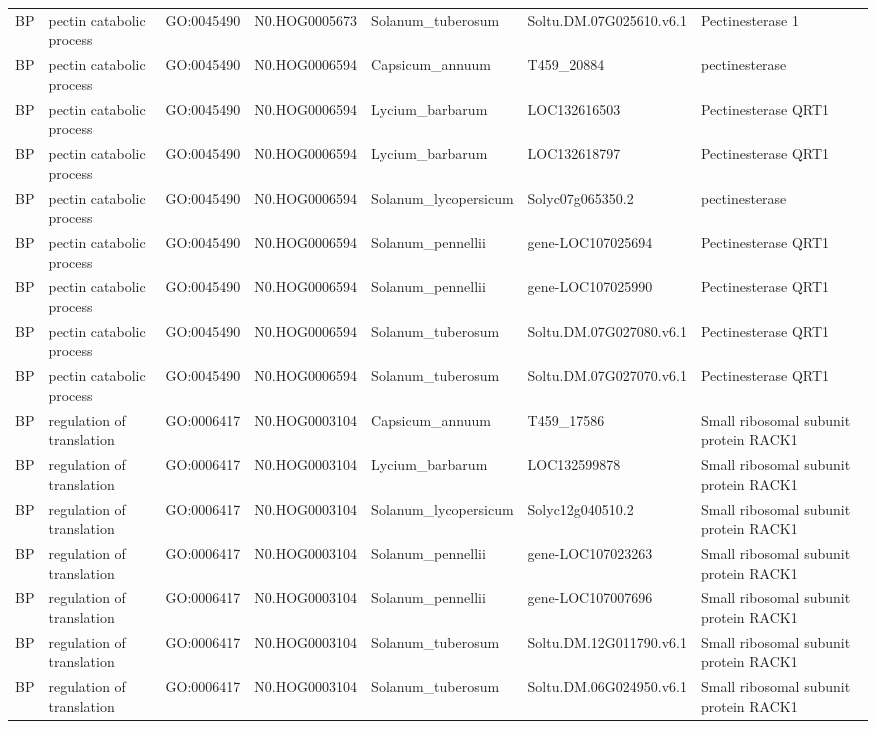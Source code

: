 \begin{table}
\begin{tabular}[t]{lllllll}
BP & pectin catabolic process & GO:0045490 & N0.HOG0005673 & Solanum\_tuberosum & Soltu.DM.07G025610.v6.1 & Pectinesterase 1\\
BP & pectin catabolic process & GO:0045490 & N0.HOG0006594 & Capsicum\_annuum & T459\_20884 & pectinesterase\\
BP & pectin catabolic process & GO:0045490 & N0.HOG0006594 & Lycium\_barbarum & LOC132616503 & Pectinesterase QRT1\\
BP & pectin catabolic process & GO:0045490 & N0.HOG0006594 & Lycium\_barbarum & LOC132618797 & Pectinesterase QRT1\\
BP & pectin catabolic process & GO:0045490 & N0.HOG0006594 & Solanum\_lycopersicum & Solyc07g065350.2 & pectinesterase\\
BP & pectin catabolic process & GO:0045490 & N0.HOG0006594 & Solanum\_pennellii & gene-LOC107025694 & Pectinesterase QRT1\\
BP & pectin catabolic process & GO:0045490 & N0.HOG0006594 & Solanum\_pennellii & gene-LOC107025990 & Pectinesterase QRT1\\
BP & pectin catabolic process & GO:0045490 & N0.HOG0006594 & Solanum\_tuberosum & Soltu.DM.07G027080.v6.1 & Pectinesterase QRT1\\
BP & pectin catabolic process & GO:0045490 & N0.HOG0006594 & Solanum\_tuberosum & Soltu.DM.07G027070.v6.1 & Pectinesterase QRT1\\
BP & regulation of translation & GO:0006417 & N0.HOG0003104 & Capsicum\_annuum & T459\_17586 & Small ribosomal subunit protein RACK1\\
BP & regulation of translation & GO:0006417 & N0.HOG0003104 & Lycium\_barbarum & LOC132599878 & Small ribosomal subunit protein RACK1\\
BP & regulation of translation & GO:0006417 & N0.HOG0003104 & Solanum\_lycopersicum & Solyc12g040510.2 & Small ribosomal subunit protein RACK1\\
BP & regulation of translation & GO:0006417 & N0.HOG0003104 & Solanum\_pennellii & gene-LOC107023263 & Small ribosomal subunit protein RACK1\\
BP & regulation of translation & GO:0006417 & N0.HOG0003104 & Solanum\_pennellii & gene-LOC107007696 & Small ribosomal subunit protein RACK1\\
BP & regulation of translation & GO:0006417 & N0.HOG0003104 & Solanum\_tuberosum & Soltu.DM.12G011790.v6.1 & Small ribosomal subunit protein RACK1\\
BP & regulation of translation & GO:0006417 & N0.HOG0003104 & Solanum\_tuberosum & Soltu.DM.06G024950.v6.1 & Small ribosomal subunit protein RACK1\\

\end{tabular}
\end{table}
